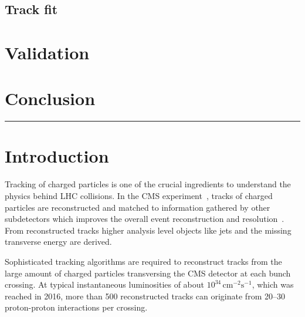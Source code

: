 
\subsection{Track fit}

\section{Validation}

\section{Conclusion}

\vspace{\baselineskip}
\hrule
\newpage

\section{Introduction}
Tracking of charged particles is one of the crucial ingredients to understand the physics behind LHC collisions. In the CMS experiment~\cite{Chatrchyan:2008aa}, tracks of charged particles are reconstructed and matched to information gathered by other subdetectors which improves the overall event reconstruction and resolution~\cite{CMS:2009nxa}. From reconstructed tracks higher analysis level objects like jets and the missing transverse energy are derived. 

Sophisticated tracking algorithms are required to reconstruct tracks from the large amount of charged particles transversing the CMS detector at each bunch crossing. At typical instantaneous luminosities of about $10^{34}\,\mathrm{cm}^{-2}\mathrm{s}^{-1}$, which was reached in 2016, more than 500 reconstructed tracks can originate from 20--30 proton-proton interactions per crossing.

